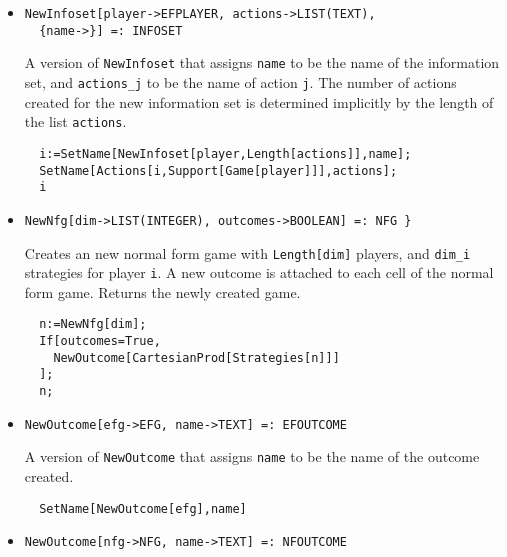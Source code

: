 \begin{itemize}

\item{}
\protect \large \begin{verbatim}
NewInfoset[player->EFPLAYER, actions->LIST(TEXT), 
  {name->}] =: INFOSET 
\end{verbatim}\normalsize

\bd 
A version of \verb+NewInfoset+ that assigns \verb+name+ to be the name
of the information set, and \verb+actions_j+ to be the name of action
\verb+j+.  The number of actions created for the new information set
is determined implicitly by the length of the list \verb+actions+.  
\begin{verbatim}
  i:=SetName[NewInfoset[player,Length[actions]],name];
  SetName[Actions[i,Support[Game[player]]],actions];
  i
\end{verbatim} 
\ed

\item{}
\protect \large \begin{verbatim}
NewNfg[dim->LIST(INTEGER), outcomes->BOOLEAN] =: NFG }
\end{verbatim}\normalsize

\bd 

Creates an new normal form game with \verb+Length[dim]+ players, and
\verb+dim_i+ strategies for player \verb+i+.  A new outcome is
attached to each cell of the normal form game.  Returns the newly
created game.

\begin{verbatim}
  n:=NewNfg[dim];
  If[outcomes=True,
    NewOutcome[CartesianProd[Strategies[n]]]
  ];
  n;
\end{verbatim} 
\ed

\item{}
\protect \large \begin{verbatim}
NewOutcome[efg->EFG, name->TEXT] =: EFOUTCOME 
\end{verbatim}\normalsize

\bd 
A version of \verb+NewOutcome+ that assigns \verb+name+ to be the name
of the outcome created.  
\begin{verbatim}
  SetName[NewOutcome[efg],name]
\end{verbatim} 
\ed

\item{}
\protect \large \begin{verbatim}
NewOutcome[nfg->NFG, name->TEXT] =: NFOUTCOME 
\end{verbatim}\normalsize


\end{itemize}
